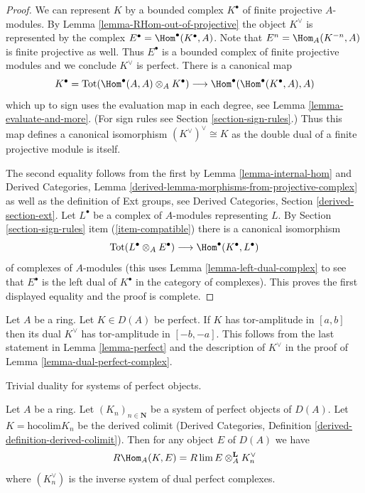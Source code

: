 \begin{proof}
We can represent $K$ by a bounded complex $K^\bullet$ of finite projective
$A$-modules. By Lemma \ref{lemma-RHom-out-of-projective} the object $K^\vee$
is represented by the complex $E^\bullet = \Hom^\bullet(K^\bullet, A)$.
Note that $E^n = \Hom_A(K^{-n}, A)$ is finite projective as well.
Thus $E^\bullet$ is a bounded complex of finite projective modules
and we conclude $K^\vee$ is perfect. There is a canonical map
$$
K^\bullet = \text{Tot}(\Hom^\bullet(A, A) \otimes_A K^\bullet)
\longrightarrow
\Hom^\bullet(\Hom^\bullet(K^\bullet, A), A)
$$
which up to sign uses the evaluation map in each degree,
see Lemma \ref{lemma-evaluate-and-more}. (For sign rules see
Section \ref{section-sign-rules}.)
Thus this map defines a canonical isomorphism $(K^\vee)^\vee \cong K$
as the double dual of a finite projective module is itself.

\medskip\noindent
The second equality follows from the first by
Lemma \ref{lemma-internal-hom} and
Derived Categories, Lemma \ref{derived-lemma-morphisms-from-projective-complex}
as well as the definition of Ext groups, see
Derived Categories, Section \ref{derived-section-ext}.
Let $L^\bullet$ be a complex of $A$-modules representing $L$.
By Section \ref{section-sign-rules} item (\ref{item-compatible})
there is a canonical isomorphism
$$
\text{Tot}(L^\bullet \otimes_A E^\bullet)
\longrightarrow
\Hom^\bullet(K^\bullet, L^\bullet)
$$
of complexes of $A$-modules (this uses Lemma \ref{lemma-left-dual-complex}
to see that $E^\bullet$ is the left dual of $K^\bullet$ in the category
of complexes). This proves the first displayed equality
and the proof is complete.
\end{proof}

\begin{remark}
\label{remark-dual-perfect-complex}
Let $A$ be a ring. Let $K \in D(A)$ be perfect. If $K$ has tor-amplitude
in $[a, b]$ then its dual $K^\vee$ has tor-amplitude in $[-b, -a]$.
This follows from the last statement in Lemma \ref{lemma-perfect}
and the description of $K^\vee$ in the proof of
Lemma \ref{lemma-dual-perfect-complex}.
\end{remark}

\begin{lemma}
\label{lemma-colim-and-lim-of-duals}
\begin{slogan}
Trivial duality for systems of perfect objects.
\end{slogan}
Let $A$ be a ring. Let $(K_n)_{n \in \mathbf{N}}$ be a system of
perfect objects of $D(A)$. Let $K = \text{hocolim} K_n$ be the derived colimit
(Derived Categories, Definition \ref{derived-definition-derived-colimit}).
Then for any object $E$ of $D(A)$ we have
$$
R\Hom_A(K, E) = R\lim E \otimes^\mathbf{L}_A K_n^\vee
$$
where $(K_n^\vee)$ is the inverse system of dual perfect complexes.
\end{lemma}

